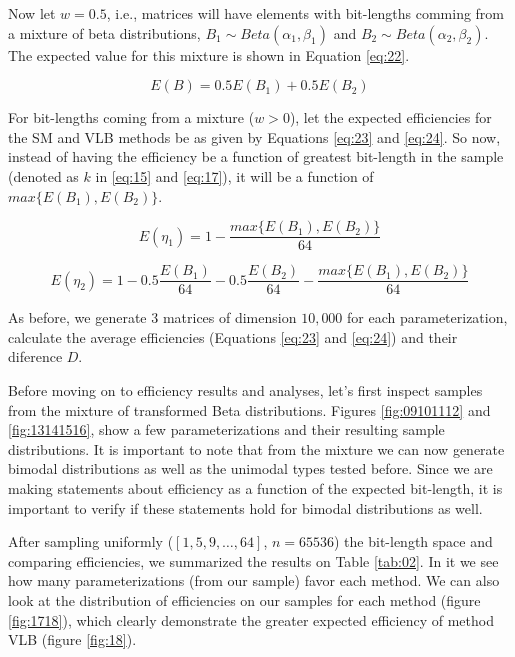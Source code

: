 \documentclass[10pt]{article}
\begin{document}
Now let $w = 0.5$, i.e., matrices will have elements with bit-lengths comming from a mixture of beta distributions, $B_1\sim Beta(\alpha_1,\beta_1)$ and $B_2\sim Beta(\alpha_2,\beta_2)$. The expected value for this mixture is shown in Equation \ref{eq:22}.
 
\begin{equation}\label{eq:22}
 E(B) = 0.5 E(B_1) + 0.5 E(B_2)
\end{equation}
 
For bit-lengths coming from a mixture ($w>0$), let the expected efficiencies for the SM and VLB methods be as given by Equations \ref{eq:23} and \ref{eq:24}. So now, instead of having the efficiency be a function of greatest bit-length in the sample (denoted as  $k$ in \ref{eq:15} and \ref{eq:17}), it will be a function of $max\{E(B_1),E(B_2)\}$.

\begin{equation}\label{eq:23}
 E(\eta_1) = 1 - \frac{max\{E(B_1),E(B_2)\}}{64}
\end{equation}

\begin{equation}\label{eq:24}
 E(\eta_2) = 1 - 0.5\frac{E(B_1)}{64} - 0.5\frac{E(B_2)}{64} - \frac{max\{E(B_1),E(B_2)\}}{64}
\end{equation}
 
As before, we generate 3 matrices of dimension $10,000$ for each parameterization, calculate the average efficiencies (Equations \ref{eq:23} and \ref{eq:24}) and their diference $D$.

Before moving on to efficiency results and analyses, let's first inspect samples from the mixture of transformed Beta distributions. Figures \ref{fig:09101112} and \ref{fig:13141516}, show a few parameterizations and their resulting sample distributions. It is important to note that from the mixture we can now generate bimodal distributions as well as the unimodal types tested before. Since we are making statements about efficiency as a function of the expected bit-length, it is important to verify if these statements hold for bimodal  distributions as well.

After sampling uniformly ($[1,5,9,\ldots,64]$, $n=65536$) the bit-length space and comparing efficiencies, we summarized the results on Table \ref{tab:02}. In it we see how many parameterizations (from our sample) favor each method. We can also look at the distribution of efficiencies on our samples for each method (figure \ref{fig:1718}), which clearly demonstrate the greater expected efficiency of method VLB (figure \ref{fig:18}).
\end{document}
